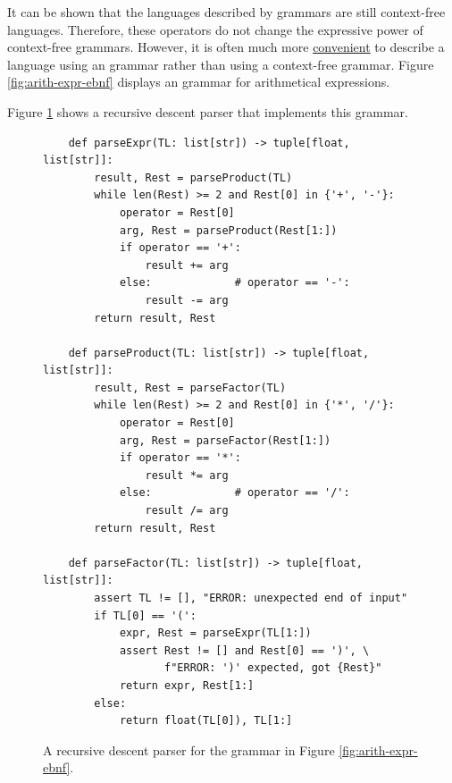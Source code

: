 It can be shown that the languages described by  grammars are still context-free
languages.  Therefore, these operators do not change the expressive power of context-free 
grammars. 
However, it is often much more \underline{convenient} to describe a language using an 
grammar rather than using a context-free grammar.  Figure \ref{fig:arith-expr-ebnf}
displays an  grammar for arithmetical expressions.  


\noindent
Figure \ref{fig:2-EBNF-Parser.ipynb} shows a recursive descent parser that implements this grammar.

\begin{figure}[!ht]
\centering
\begin{verbatim}
    def parseExpr(TL: list[str]) -> tuple[float, list[str]]:
        result, Rest = parseProduct(TL)
        while len(Rest) >= 2 and Rest[0] in {'+', '-'}: 
            operator = Rest[0]
            arg, Rest = parseProduct(Rest[1:])
            if operator == '+': 
                result += arg
            else:             # operator == '-': 
                result -= arg
        return result, Rest
    
    def parseProduct(TL: list[str]) -> tuple[float, list[str]]:
        result, Rest = parseFactor(TL)
        while len(Rest) >= 2 and Rest[0] in {'*', '/'}:
            operator = Rest[0]
            arg, Rest = parseFactor(Rest[1:])
            if operator == '*':
                result *= arg
            else:             # operator == '/':
                result /= arg
        return result, Rest
    
    def parseFactor(TL: list[str]) -> tuple[float, list[str]]:
        assert TL != [], "ERROR: unexpected end of input"
        if TL[0] == '(':
            expr, Rest = parseExpr(TL[1:])
            assert Rest != [] and Rest[0] == ')', \
                   f"ERROR: ')' expected, got {Rest}"
            return expr, Rest[1:]
        else:
            return float(TL[0]), TL[1:]
\end{verbatim}
\vspace*{-0.3cm}
\caption{A recursive descent parser for the grammar in Figure \ref{fig:arith-expr-ebnf}.}
\label{fig:2-EBNF-Parser.ipynb}
\end{figure}

